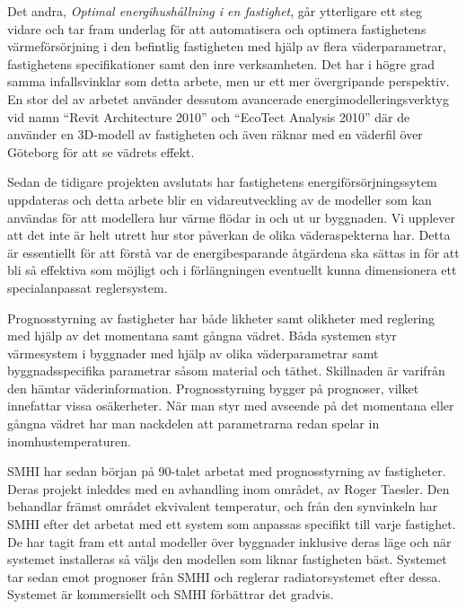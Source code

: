 Det andra, \textit{Optimal energihushållning i en fastighet}\cite{kandidatarbete2010},
går ytterligare ett steg vidare och tar fram underlag för att automatisera och
optimera fastighetens värmeförsörjning i den befintlig fastigheten med hjälp av
flera väderparametrar, fastighetens specifikationer samt den inre verksamheten. Det har i högre grad samma infallsvinklar som detta arbete, men ur ett mer övergripande perspektiv. En stor del av arbetet använder dessutom avancerade energimodelleringsverktyg vid namn ``Revit Architecture 2010'' och 
``EcoTect Analysis 2010'' där de använder en 3D-modell av fastigheten och även
räknar med en väderfil över Göteborg för att se vädrets effekt.

Sedan de tidigare projekten avslutats har fastighetens energiförsörjningssytem uppdateras och detta arbete blir en vidareutveckling av de modeller som kan användas för att modellera hur värme flödar in och ut ur byggnaden. Vi upplever att det inte är helt utrett hur stor påverkan de olika väderaspekterna har. Detta är essentiellt för att förstå var de energibesparande åtgärdena ska sättas in för att bli så effektiva som möjligt och i förlängningen eventuellt kunna dimensionera ett specialanpassat reglersystem.

Prognosstyrning av fastigheter har både likheter samt olikheter med reglering med hjälp av det momentana samt gångna vädret. Båda systemen styr värmesystem i byggnader med hjälp av olika väderparametrar samt byggnadsspecifika parametrar såsom material och täthet. Skillnaden är varifrån den hämtar väderinformation. Prognosstyrning bygger på prognoser, vilket innefattar vissa osäkerheter. När man styr med avseende på det momentana eller gångna vädret har man nackdelen att parametrarna redan spelar in inomhustemperaturen.

SMHI har sedan början på 90-talet arbetat med prognosstyrning av fastigheter. Deras projekt inleddes med en avhandling inom området, av Roger Taesler. Den behandlar främst området ekvivalent temperatur, och från den synvinkeln har SMHI efter det arbetat med ett system som anpassas specifikt till varje fastighet. De har tagit fram ett antal modeller över byggnader inklusive deras läge och när systemet installeras så väljs den modellen som liknar fastigheten bäst. Systemet tar sedan emot prognoser från SMHI och reglerar radiatorsystemet efter dessa. Systemet är kommersiellt och SMHI förbättrar det gradvis.







